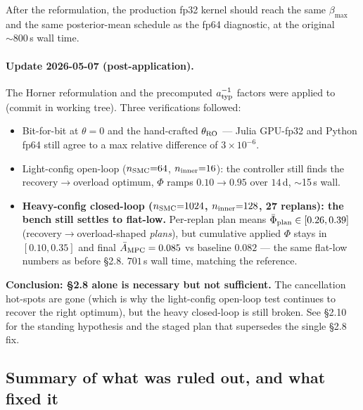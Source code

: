 \documentclass[11pt,a4paper]{article}
\begin{document}
After the reformulation, the production fp32 kernel should reach the
same $\beta_{\max}$ and the same posterior-mean schedule as the fp64
diagnostic, at the original $\sim 800$\,s wall time.

\paragraph{Update 2026-05-07 (post-application).}
The Horner reformulation and the precomputed $a_{\rm typ}^{-1}$
factors were applied to  (commit
in working tree). Three verifications followed:
\begin{itemize}[itemsep=2pt]
\item Bit-for-bit at $\theta=0$ and the hand-crafted
  $\theta_{\rm RO}$ — Julia GPU-fp32 and Python fp64 still agree to a
  max relative difference of $3\times 10^{-6}$.
\item Light-config open-loop ($n_{\rm SMC}{=}64$, $n_{\rm inner}{=}16$):
  the controller still finds the recovery$\to$overload optimum,
  $\Phi$ ramps $0.10 \to 0.95$ over $14\,$d, $\sim$15\,s wall.
\item \textbf{Heavy-config closed-loop ($n_{\rm SMC}{=}1024$,
  $n_{\rm inner}{=}128$, 27 replans): the bench still settles to
  flat-low.} Per-replan plan means $\bar\Phi_{\rm plan} \in
  [0.26, 0.39]$ (recovery$\to$overload-shaped \emph{plans}), but
  cumulative applied $\Phi$ stays in $[0.10, 0.35]$ and final
  $\bar A_{\rm MPC}=0.085$ vs baseline $0.082$ --- the same flat-low
  numbers as before \S2.8. $701$\,s wall time, matching the reference.
\end{itemize}

\textbf{Conclusion: \S2.8 alone is necessary but not sufficient.}
The cancellation hot-spots are gone (which is why the light-config
open-loop test continues to recover the right optimum), but the heavy
closed-loop is still broken. See \S2.10 for the standing hypothesis and
the staged plan that supersedes the single \S2.8 fix.

\subsection{Summary of what was ruled out, and what fixed it}
\end{document}
